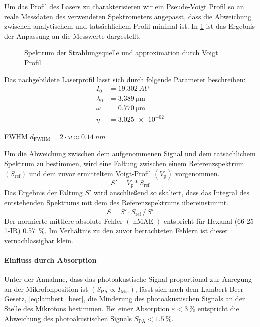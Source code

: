 Um das Profil des Lasers zu charakterisieren wir ein Pseude-Voigt Profil so an reale Messdaten des verwendeten Spektrometers angepasst, dass die Abweichung zwischen analytischem und tatsächlichem Profil minimal ist.
In \cref{fig:VoigtProfil} ist das Ergebnis der Anpassung an die Messwerte dargestellt.
\begin{figure}[htb]
    \centering
    
    \caption{Spektrum der Strahlungsquelle und approximation durch Voigt Profil}
    \label{fig:VoigtProfil}
\end{figure}

Das nachgebildete Laserprofil lässt sich durch folgende Parameter  beschreiben:
\begin{subequations}
    \begin{align*}
        I_0 &= \SI{19.302}{AU} \\
        \lambda_0 &= \SI{3.389}{\micro\meter} \\
        \omega &= \SI{0.770}{\micro\meter} \\
        \eta &= \num{3.025e-02}
    \end{align*}
\end{subequations}

\gls{FWHM} $d_\mathrm{FWHM} = 2 \cdot \omega \approx \SI{0.14}{nm}$

Um die Abweichung zwischen dem aufgenommenen Signal und dem tatsächlichem Spektrum zu bestimmen, wird eine Faltung zwischen einem Referenzspektrum $(S_\mathrm{ref})$ und dem zuvor ermitteltem Voigt-Profil $(V_\mathrm{p})$ vorgenommen.
\begin{equation}
    S' = V_\mathrm{p} * S_\mathrm{ref}
\end{equation}
Das Ergebnis der Faltung $S'$ wird anschließend so skaliert, dass das Integral des entstehenden Spektrums mit dem des Referenzspektrums übereinstimmt.
\begin{equation}
    S =  S' \cdot \bar{S}_\mathrm{ref}\,/\,\bar{S}'
\end{equation}
Der normierte mittlere absolute Fehler $(\operatorname{nMAE})$ entspricht für Hexanal (66-25-1-IR) \SI{0.57}{\percent}.
Im Verhältnis zu den zuvor betrachteten Fehlern ist dieser vernachlässigbar klein. 


\paragraph{Einfluss durch Absorption}
Unter der Annahme, dass das photoakustische Signal proportional zur Anregung an der Mikrofonposition ist $(S_\mathrm{PA} \propto I_\mathrm{Mic})$, lässt sich nach dem Lambert-Beer Gesetz, \cref{eq:lambert_beer}, die Minderung des photoakustischen Signals an der Stelle des Mikrofons bestimmen.
Bei einer Absorption $\varepsilon < \SI{3}{\percent}$ entspricht die Abweichung des photoakustischen Signals $S_\mathrm{PA} < \SI{1.5}{\percent}$.

